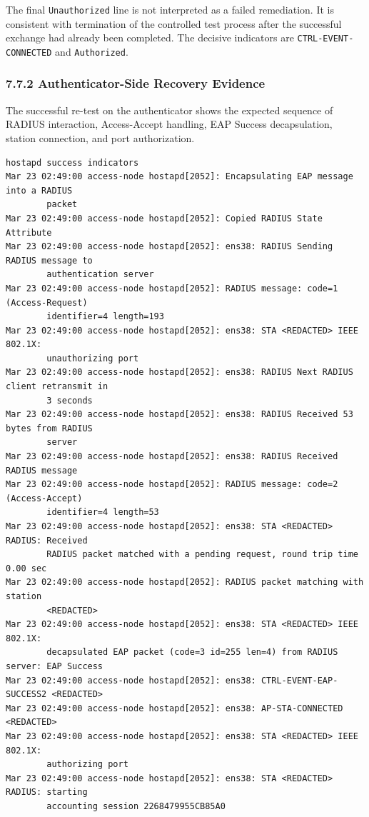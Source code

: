 \documentclass[11pt]{article}
\begin{document}
The final \texttt{Unauthorized} line is not interpreted as a failed remediation. It is consistent with termination of the controlled test process after the successful exchange had already been completed. The decisive indicators are \texttt{CTRL-EVENT-CONNECTED} and \texttt{Authorized}.

\subsubsection{7.7.2 Authenticator-Side Recovery Evidence}
\label{sec:authenticator-side-recovery-evidence}

The successful re-test on the authenticator shows the expected sequence of RADIUS interaction, Access-Accept handling, EAP Success decapsulation, station connection, and port authorization.


\begin{verbatim}
hostapd success indicators
Mar 23 02:49:00 access-node hostapd[2052]: Encapsulating EAP message into a RADIUS 
        packet
Mar 23 02:49:00 access-node hostapd[2052]: Copied RADIUS State Attribute
Mar 23 02:49:00 access-node hostapd[2052]: ens38: RADIUS Sending RADIUS message to 
        authentication server
Mar 23 02:49:00 access-node hostapd[2052]: RADIUS message: code=1 (Access-Request) 
        identifier=4 length=193
Mar 23 02:49:00 access-node hostapd[2052]: ens38: STA <REDACTED> IEEE 802.1X: 
        unauthorizing port
Mar 23 02:49:00 access-node hostapd[2052]: ens38: RADIUS Next RADIUS client retransmit in 
        3 seconds
Mar 23 02:49:00 access-node hostapd[2052]: ens38: RADIUS Received 53 bytes from RADIUS 
        server
Mar 23 02:49:00 access-node hostapd[2052]: ens38: RADIUS Received RADIUS message
Mar 23 02:49:00 access-node hostapd[2052]: RADIUS message: code=2 (Access-Accept) 
        identifier=4 length=53
Mar 23 02:49:00 access-node hostapd[2052]: ens38: STA <REDACTED> RADIUS: Received 
        RADIUS packet matched with a pending request, round trip time 0.00 sec
Mar 23 02:49:00 access-node hostapd[2052]: RADIUS packet matching with station 
        <REDACTED>
Mar 23 02:49:00 access-node hostapd[2052]: ens38: STA <REDACTED> IEEE 802.1X: 
        decapsulated EAP packet (code=3 id=255 len=4) from RADIUS server: EAP Success
Mar 23 02:49:00 access-node hostapd[2052]: ens38: CTRL-EVENT-EAP-SUCCESS2 <REDACTED>
Mar 23 02:49:00 access-node hostapd[2052]: ens38: AP-STA-CONNECTED <REDACTED>
Mar 23 02:49:00 access-node hostapd[2052]: ens38: STA <REDACTED> IEEE 802.1X: 
        authorizing port
Mar 23 02:49:00 access-node hostapd[2052]: ens38: STA <REDACTED> RADIUS: starting 
        accounting session 2268479955CB85A0
\end{verbatim}
\end{document}
